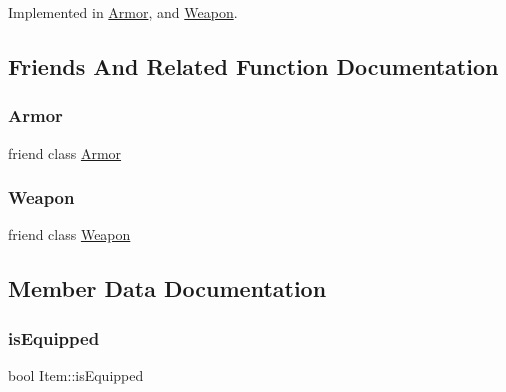 Implemented in \mbox{\hyperlink{class_armor_a4fe1507d7aaf280a18e19f51a6f8c42d}{Armor}}, and \mbox{\hyperlink{class_weapon_a5bd0118be0d84307c0865a63d907fec7}{Weapon}}.



\subsection{Friends And Related Function Documentation}
\mbox{\label{class_item_aacd78ed1db38c3d74aa80233c16b3e9c}} 
\subsubsection{\texorpdfstring{Armor}{Armor}}
{\footnotesize\ttfamily friend class \mbox{\hyperlink{class_armor}{Armor}}\hspace{0.3cm}{\ttfamily [friend]}}

\mbox{\label{class_item_ab356dbee0f1e915287732c65e8ef61e1}} 
\subsubsection{\texorpdfstring{Weapon}{Weapon}}
{\footnotesize\ttfamily friend class \mbox{\hyperlink{class_weapon}{Weapon}}\hspace{0.3cm}{\ttfamily [friend]}}



\subsection{Member Data Documentation}
\mbox{\label{class_item_a47a03cb11d41796494640d62f4d6b9d2}} 
\subsubsection{\texorpdfstring{is\+Equipped}{isEquipped}}
{\footnotesize\ttfamily bool Item\+::is\+Equipped\hspace{0.3cm}{\ttfamily [private]}}

\mbox{\label{class_item_a9ba716084bdafdbd767aade37259b56b}} 
